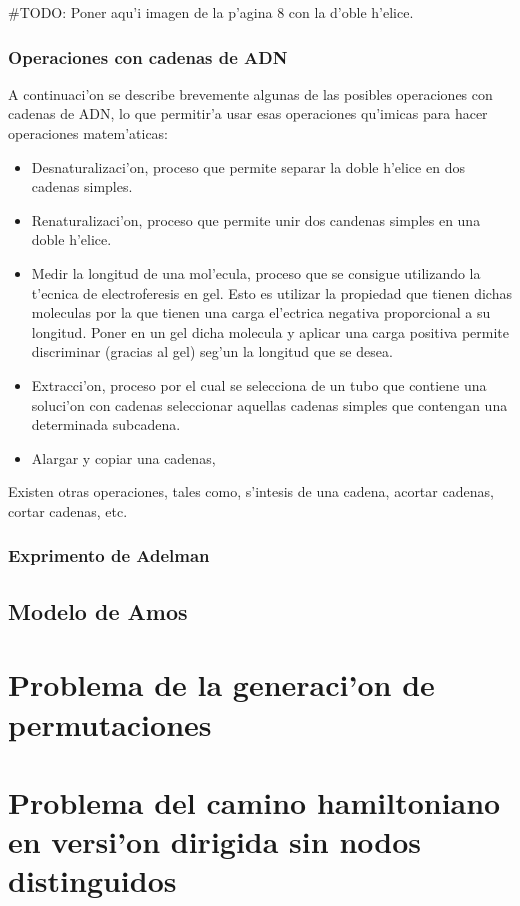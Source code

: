 \documentclass[12pt]{article}
\begin{document}
#TODO: Poner aqu'i imagen de la p'agina 8 con la d'oble h'elice.

\subsubsection{Operaciones con cadenas de ADN}

A continuaci'on se describe brevemente algunas de las posibles operaciones con cadenas de ADN, lo que permitir'a
usar esas operaciones qu'imicas para hacer operaciones matem'aticas:

\begin{itemize}
    \item Desnaturalizaci'on, proceso que permite separar la doble h'elice en dos cadenas simples.
    \item Renaturalizaci'on, proceso que permite unir dos candenas simples en una doble h'elice.
    \item Medir la longitud de una mol'ecula, proceso que se consigue utilizando la t'ecnica de electroferesis
    en gel. Esto es utilizar la propiedad que tienen dichas moleculas por la que tienen una carga el'ectrica
    negativa proporcional a su longitud. Poner en un gel dicha molecula y aplicar una carga positiva
    permite discriminar (gracias al gel) seg'un la longitud que se desea.
    \item Extracci'on, proceso por el cual se selecciona de un tubo que contiene una soluci'on con cadenas
    seleccionar aquellas cadenas simples que contengan una determinada subcadena.
    \item Alargar y copiar una cadenas,
\end{itemize}

Existen otras operaciones, tales como, s'intesis de una cadena, acortar cadenas, cortar cadenas, etc.

\subsubsection{Exprimento de Adelman}



\subsection{Modelo de Amos}

\section{Problema de la generaci'on de permutaciones}

\section{Problema del camino hamiltoniano en versi'on dirigida sin nodos distinguidos}

\printbibliography
\end{document}
